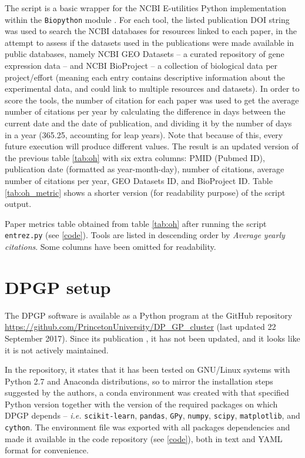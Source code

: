 The script is a basic wrapper for the NCBI E-utilities \citep{bethesdaEntrezProgrammingUtilities2010} Python implementation within the \texttt{Biopython} module \citep{cockBiopythonFreelyAvailable2009}. For each tool, the listed publication DOI string was used to search the NCBI databases for resources linked to each paper, in the attempt to assess if the datasets used in the publications were made available in public databases, namely NCBI GEO Datasets -- a curated repository of gene expression data -- and NCBI BioProject -- a collection of biological data per project/effort (meaning each entry contains descriptive information about the experimental data, and could link to multiple resources and datasets).
In order to score the tools, the number of citation for each paper was used to get the average number of citations per year by calculating the difference in days between the current date and the date of publication, and dividing it by the number of days in a year (365.25, accounting for leap years). Note that because of this, every future execution will produce different values. The result is an updated version of the previous table \ref{tab:oh} with six extra columns: PMID (Pubmed ID), publication date (formatted as year-month-day), number of citations, average number of citations per year, GEO Datasets ID, and BioProject ID. Table \ref{tab:oh_metric} shows a shorter version (for readability purpose) of the script output.

\begin{table}[!ht]
    \centering\footnotesize
    
    \caption[Paper metrics table obtained from table \ref{tab:oh}]{Paper metrics table obtained from table \ref{tab:oh} after running the script \texttt{entrez.py} (see \ref{code}). Tools are listed in descending order by \emph{Average yearly citations}. Some columns have been omitted for readability.}
    \label{tab:oh_metric}
\end{table}

\section{DPGP setup}
The DPGP software is available as a Python program at the GitHub repository \url{https://github.com/PrincetonUniversity/DP_GP_cluster} (last updated 22 September 2017). Since its publication \citep{mcdowellClusteringGeneExpression2018}, it has not been updated, and it looks like it is not actively maintained.

In the repository, it states that it has been tested on GNU/Linux systems with Python 2.7 and Anaconda distributions, so to mirror the installation steps suggested by the authors, a conda environment was created with that specified Python version together with the version of the required packages on which DPGP depends -- \textit{i.e.} \texttt{scikit-learn}, \texttt{pandas}, \texttt{GPy}, \texttt{numpy}, \texttt{scipy}, \texttt{matplotlib}, and \texttt{cython}. The environment file was exported with all packages dependencies and made it available in the code repository (see \ref{code}), both in text and YAML format for convenience.

